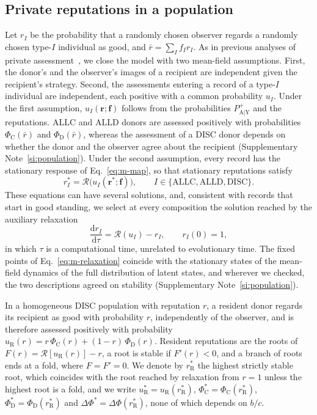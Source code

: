\documentclass[10pt]{wlscirep}
\newcommand{\Rmap}{\mathscr{R}}            %
\newcommand{\Pp}[1]{P^{+}_{\mathrm{#1}}}   %
\newcommand{\rR}{r_{\mathrm{R}}^{*}}
\newcommand{\uR}{u_{\mathrm{R}}^{*}}
\newcommand{\PhiC}{\Phi_{\mathrm{C}}}
\newcommand{\PhiD}{\Phi_{\mathrm{D}}}
\newcommand{\PhiCs}{\Phi^{*}_{\mathrm{C}}}
\newcommand{\PhiDs}{\Phi^{*}_{\mathrm{D}}}
\newcommand{\dPhi}{\Delta\Phi^{*}}
\newcommand{\dd}{\mathrm{d}}
\newcommand{\ALLC}{\mathrm{ALLC}}
\newcommand{\ALLD}{\mathrm{ALLD}}
\newcommand{\DISC}{\mathrm{DISC}}
\theoremstyle{plain}
\theoremstyle{remark}
\begin{document}
\subsection*{Private reputations in a population}

Let $r_I$ be the probability that a randomly chosen observer regards a randomly chosen type-$I$ individual as good, and $\bar r=\sum_If_Ir_I$. As in previous analyses of private assessment~\cite{okada2018,radzvilavicius2019,kessinger2023,michelmata2024,kawakatsu2024}, we close the model with two mean-field assumptions. First, the donor's and the observer's images of a recipient are independent given the recipient's strategy. Second, the assessments entering a record of a type-$I$ individual are independent, each positive with a common probability $u_I$. Under the first assumption, $u_I(\bm r;\bm f)$ follows from the probabilities $\Pp{A|Y}$ and the reputations. ALLC and ALLD donors are assessed positively with probabilities $\PhiC(\bar r)$ and $\PhiD(\bar r)$, whereas the assessment of a DISC donor depends on whether the donor and the observer agree about the recipient (Supplementary Note~\ref{si:population}). Under the second assumption, every record has the stationary response of Eq.~\eqref{eq:m-map}, so that stationary reputations satisfy
\begin{equation}
r_I^*=\Rmap\bigl(u_I(\bm r^*;\bm f)\bigr),\qquad I\in\{\ALLC,\ALLD,\DISC\}.
\label{eq:m-selfconsistency}
\end{equation}
These equations can have several solutions, and, consistent with records that start in good standing, we select at every composition the solution reached by the auxiliary relaxation
\begin{equation}
\frac{\dd r_I}{\dd\tau}=\Rmap(u_I)-r_I,\qquad r_I(0)=1,
\label{eq:m-relaxation}
\end{equation}
in which $\tau$ is a computational time, unrelated to evolutionary time. The fixed points of Eq.~\eqref{eq:m-relaxation} coincide with the stationary states of the mean-field dynamics of the full distribution of latent states, and wherever we checked, the two descriptions agreed on stability (Supplementary Note~\ref{si:population}).

In a homogeneous DISC population with reputation $r$, a resident donor regards its recipient as good with probability $r$, independently of the observer, and is therefore assessed positively with probability $u_{\mathrm R}(r)=r\,\PhiC(r)+(1-r)\,\PhiD(r)$. Resident reputations are the roots of $F(r)=\Rmap[u_{\mathrm R}(r)]-r$, a root is stable if $F'(r)<0$, and a branch of roots ends at a fold, where $F=F'=0$. We denote by $\rR$ the highest strictly stable root, which coincides with the root reached by relaxation from $r=1$ unless the highest root is a fold, and we write $\uR=u_{\mathrm R}(\rR)$, $\PhiCs=\PhiC(\rR)$, $\PhiDs=\PhiD(\rR)$ and $\dPhi=\Delta\Phi(\rR)$, none of which depends on $b/c$.
\end{document}
